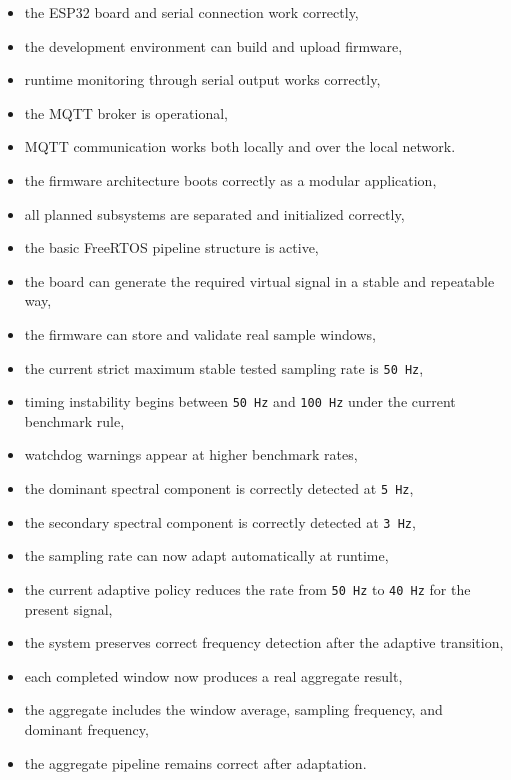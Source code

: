 \documentclass[12pt,a4paper]{article}
\begin{document}
\begin{itemize}
    \item the ESP32 board and serial connection work correctly,
    \item the development environment can build and upload firmware,
    \item runtime monitoring through serial output works correctly,
    \item the MQTT broker is operational,
    \item MQTT communication works both locally and over the local network.
    \item the firmware architecture boots correctly as a modular application,
    \item all planned subsystems are separated and initialized correctly,
    \item the basic FreeRTOS pipeline structure is active,
    \item the board can generate the required virtual signal in a stable and
    repeatable way,
    \item the firmware can store and validate real sample windows,
    \item the current strict maximum stable tested sampling rate is
    \texttt{50 Hz},
    \item timing instability begins between \texttt{50 Hz} and \texttt{100 Hz}
    under the current benchmark rule,
    \item watchdog warnings appear at higher benchmark rates,
    \item the dominant spectral component is correctly detected at
    \texttt{5 Hz},
    \item the secondary spectral component is correctly detected at
    \texttt{3 Hz},
    \item the sampling rate can now adapt automatically at runtime,
    \item the current adaptive policy reduces the rate from \texttt{50 Hz} to
    \texttt{40 Hz} for the present signal,
    \item the system preserves correct frequency detection after the adaptive
    transition,
    \item each completed window now produces a real aggregate result,
    \item the aggregate includes the window average, sampling frequency, and
    dominant frequency,
    \item the aggregate pipeline remains correct after adaptation.
\end{itemize}
\end{document}
